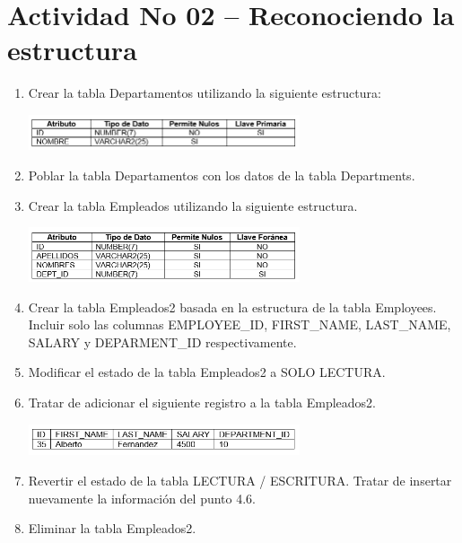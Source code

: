 \section{Actividad No 02 – Reconociendo la estructura} 

\begin{enumerate}[1.]
	\item Crear la tabla Departamentos utilizando la siguiente estructura:
	\begin{center}
	\includegraphics[width=8cm]{./Imagenes/Actividad2} 
	\end{center}
	\item Poblar la tabla Departamentos con los datos de la tabla Departments.
	\item Crear la tabla Empleados utilizando la siguiente estructura.
	\begin{center}
	\includegraphics[width=8cm]{./Imagenes/Actividad2_03} 
	\end{center}
	\item Crear la tabla Empleados2 basada en la estructura de la tabla Employees. Incluir solo las columnas EMPLOYEE\_ID, FIRST\_NAME, LAST\_NAME, SALARY y DEPARMENT\_ID 		respectivamente.
	\item Modificar el estado de la tabla Empleados2 a SOLO LECTURA.
	\item Tratar de adicionar el siguiente registro a la tabla Empleados2.
	\begin{center}
	\includegraphics[width=8cm]{./Imagenes/Actividad2_06} 
	\end{center}
	\item Revertir el estado de la tabla LECTURA / ESCRITURA. Tratar de insertar nuevamente la información del punto 4.6.
	\item Eliminar la tabla Empleados2.	
\end{enumerate}